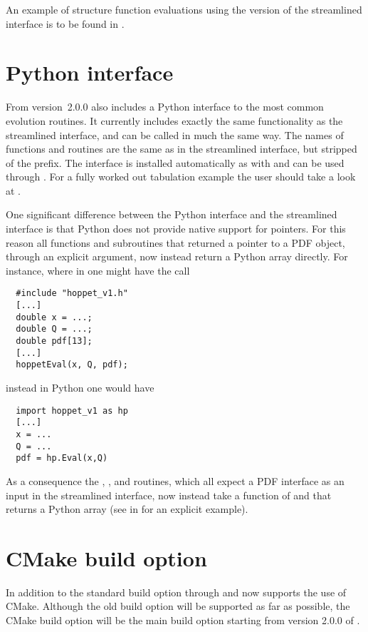 An example of structure function evaluations using the \CPP{} version of
the streamlined interface is to be found in
.
%

\section{Python interface}
From version~2.0.0 \hoppet also includes a Python interface to the
most common evolution routines. It currently includes exactly the same
functionality as the streamlined interface, and can be called in much
the same way. The names of functions and routines are the same as in
the streamlined interface, but stripped of the 
prefix. The interface is installed automatically as 
with  and can be used through . For a
fully worked out tabulation example the user should take a look at
.

One significant difference between the Python interface and the
streamlined interface is that Python does not provide native support
for pointers. For this reason all functions and subroutines that
returned a pointer to a PDF object, through an explicit argument, now
instead return a Python array directly. For instance, where in \CPP{}
one might have the call
%
\begin{lstlisting}
  #include "hoppet_v1.h"
  [...]
  double x = ...;
  double Q = ...;
  double pdf[13];
  [...]
  hoppetEval(x, Q, pdf);
\end{lstlisting}
%
instead in Python one would have
%
\begin{lstlisting}
  import hoppet_v1 as hp
  [...]
  x = ...
  Q = ...
  pdf = hp.Eval(x,Q)
\end{lstlisting}
As a consequence the , , and
 routines, which all expect a PDF interface as an input in
the streamlined interface, now instead take a function of  and
 that returns a Python array (see  in
for an explicit example).

\section{CMake build option}
In addition to the standard build option through  and
 \hoppet now supports the use of CMake. Although
the old build option will be supported as far as possible, the CMake
build option will be the main build option starting from version
2.0.0 of \hoppet.


